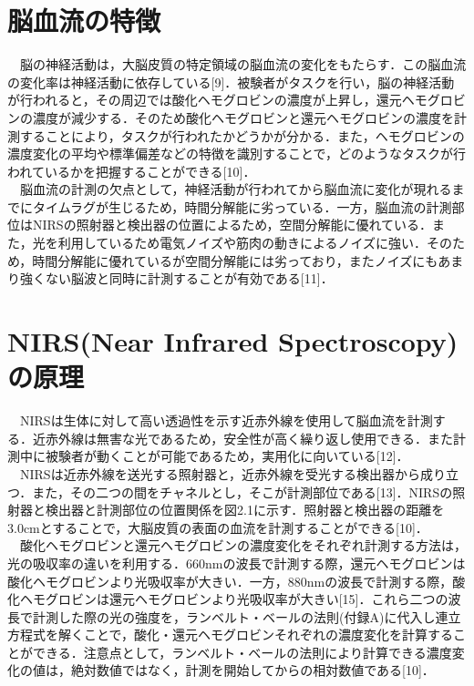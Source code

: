 \documentclass[a4j,12pt]{jreport}
\begin{document}
\section{脳血流の特徴}
　脳の神経活動は，大脳皮質の特定領域の脳血流の変化をもたらす．この脳血流の変化率は神経活動に依存している[9]．被験者がタスクを行い，脳の神経活動が行われると，その周辺では酸化ヘモグロビンの濃度が上昇し，還元ヘモグロビンの濃度が減少する．そのため酸化ヘモグロビンと還元ヘモグロビンの濃度を計測することにより，タスクが行われたかどうかが分かる．また，ヘモグロビンの濃度変化の平均や標準偏差などの特徴を識別することで，どのようなタスクが行われているかを把握することができる[10]．\\
　脳血流の計測の欠点として，神経活動が行われてから脳血流に変化が現れるまでにタイムラグが生じるため，時間分解能に劣っている．一方，脳血流の計測部位はNIRSの照射器と検出器の位置によるため，空間分解能に優れている．また，光を利用しているため電気ノイズや筋肉の動きによるノイズに強い．そのため，時間分解能に優れているが空間分解能には劣っており，またノイズにもあまり強くない脳波と同時に計測することが有効である[11]．\\

\section{NIRS(Near Infrared Spectroscopy)の原理}
　NIRSは生体に対して高い透過性を示す近赤外線を使用して脳血流を計測する．近赤外線は無害な光であるため，安全性が高く繰り返し使用できる．また計測中に被験者が動くことが可能であるため，実用化に向いている[12]．\\
　NIRSは近赤外線を送光する照射器と，近赤外線を受光する検出器から成り立つ．また，その二つの間をチャネルとし，そこが計測部位である[13]．NIRSの照射器と検出器と計測部位の位置関係を図2.1に示す．照射器と検出器の距離を3.0cmとすることで，大脳皮質の表面の血流を計測することができる[10]．\\
　酸化ヘモグロビンと還元ヘモグロビンの濃度変化をそれぞれ計測する方法は，光の吸収率の違いを利用する．660nmの波長で計測する際，還元ヘモグロビンは酸化ヘモグロビンより光吸収率が大きい．一方，880nmの波長で計測する際，酸化ヘモグロビンは還元ヘモグロビンより光吸収率が大きい[15]．これら二つの波長で計測した際の光の強度を，ランベルト・ベールの法則(付録A)に代入し連立方程式を解くことで，酸化・還元ヘモグロビンそれぞれの濃度変化を計算することができる．注意点として，ランベルト・ベールの法則により計算できる濃度変化の値は，絶対数値ではなく，計測を開始してからの相対数値である[10]．\\
\end{document}
